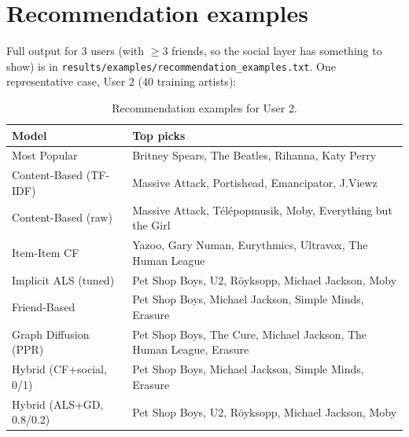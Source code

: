 \documentclass[11pt,a4paper]{article}
\newcommand{\code}[1]{\texttt{#1}}
\begin{document}
\section{Recommendation examples}
\label{sec:examples}

Full output for 3 users (with $\geq$3 friends, so the social layer has something to show) is in \code{results/examples/recommendation\_examples.txt}. One representative case, User 2 (40 training artists):

\begin{table}[!htbp]
\centering
\small
\begin{tabular}{lp{9.5cm}}
\toprule
Model & Top picks \\
\midrule
Most Popular & Britney Spears, The Beatles, Rihanna, Katy Perry \\
Content-Based (TF-IDF) & Massive Attack, Portishead, Emancipator, J.Viewz \\
Content-Based (raw) & Massive Attack, T\'el\'epopmusik, Moby, Everything but the Girl \\
Item-Item CF & Yazoo, Gary Numan, Eurythmics, Ultravox, The Human League \\
Implicit ALS (tuned) & Pet Shop Boys, U2, R\"oyksopp, Michael Jackson, Moby \\
Friend-Based & Pet Shop Boys, Michael Jackson, Simple Minds, Erasure \\
Graph Diffusion (PPR) & Pet Shop Boys, The Cure, Michael Jackson, The Human League, Erasure \\
Hybrid (CF+social, 0/1) & Pet Shop Boys, Michael Jackson, Simple Minds, Erasure \\
Hybrid (ALS+GD, 0.8/0.2) & Pet Shop Boys, U2, R\"oyksopp, Michael Jackson, Moby \\
\bottomrule
\end{tabular}
\caption{Recommendation examples for User 2.}
\end{table}
\end{document}
